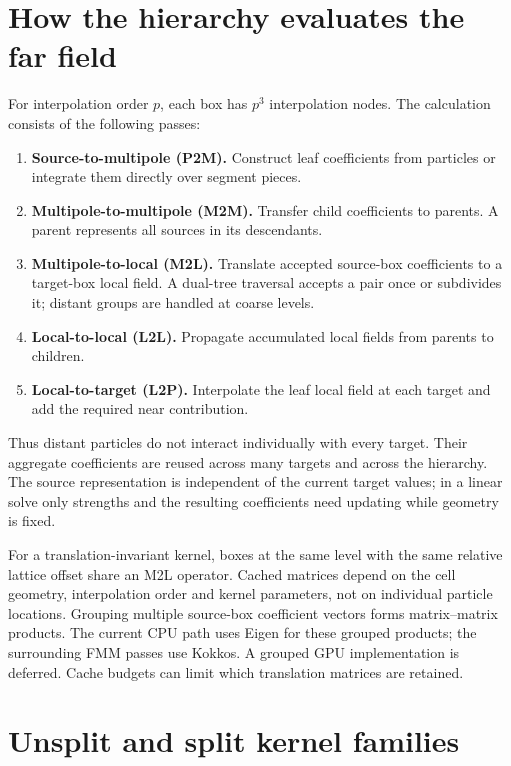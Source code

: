\section{How the hierarchy evaluates the far field}
For interpolation order $p$, each box has $p^3$ interpolation nodes. The
calculation consists of the following passes:
\begin{enumerate}
 \item \textbf{Source-to-multipole (P2M).} Construct leaf coefficients from
 particles or integrate them directly over segment pieces.
 \item \textbf{Multipole-to-multipole (M2M).} Transfer child coefficients to
 parents. A parent represents all sources in its descendants.
 \item \textbf{Multipole-to-local (M2L).} Translate accepted source-box
 coefficients to a target-box local field. A dual-tree traversal accepts a
 pair once or subdivides it; distant groups are handled at coarse levels.
 \item \textbf{Local-to-local (L2L).} Propagate accumulated local fields from
 parents to children.
 \item \textbf{Local-to-target (L2P).} Interpolate the leaf local field at
 each target and add the required near contribution.
\end{enumerate}
Thus distant particles do not interact individually with every target.
Their aggregate coefficients are reused across many targets and across the
hierarchy. The source representation is independent of the current target
values; in a linear solve only strengths and the resulting coefficients need
updating while geometry is fixed.

For a translation-invariant kernel, boxes at the same level with the same
relative lattice offset share an M2L operator. Cached matrices depend on the
cell geometry, interpolation order and kernel parameters, not on individual
particle locations. Grouping multiple source-box coefficient vectors forms
matrix--matrix products. The current CPU path uses Eigen for these grouped
products; the surrounding FMM passes use Kokkos. A grouped GPU implementation
is deferred. Cache budgets can limit which translation matrices are retained.

\section{Unsplit and split kernel families}
